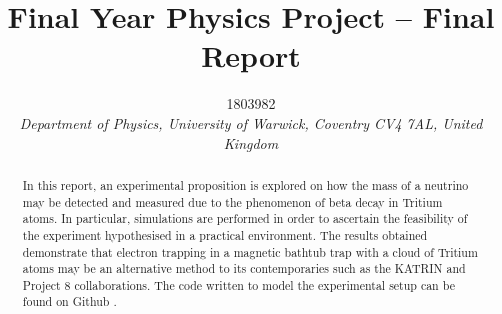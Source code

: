 \documentclass[a4paper,12pt, notitlepage]{article}
\begin{document}
\title{\textbf{\large{Final Year Physics Project – Final Report}}}

\author{\normalsize{1803982} \\
        \small\textit{
        Department of Physics, University of Warwick,
        Coventry CV4 7AL, United Kingdom}}
\date{}
\maketitle
\vspace{-10mm}

\begin{abstract} 
\noindent
In this report, an experimental proposition is explored on how the mass of a neutrino may be detected and measured due to the phenomenon of beta decay in Tritium atoms. In particular, simulations are performed in order to ascertain the feasibility of the experiment hypothesised in a practical environment. The results obtained demonstrate that electron trapping in a magnetic bathtub trap with a cloud of Tritium atoms may be an alternative method to its contemporaries such as the KATRIN and Project 8 collaborations. The code written to model the experimental setup can be found on Github \cite{githublink}.
\end{abstract}
\vspace{6mm}
\end{document}
